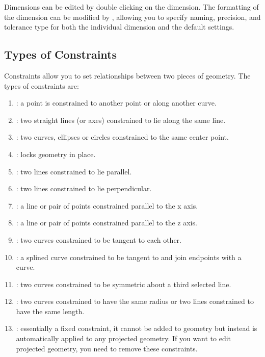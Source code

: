 Dimensions can be edited by double clicking on the dimension. The formatting of the dimension can be modified by , allowing you to specify naming, precision, and tolerance type for both the individual dimension and the default settings.


\subsection{Types of Constraints}

Constraints allow you to set relationships between two pieces of geometry. The types of constraints are:

\begin{enumerate}
\item {}: a point is constrained to another point or along another curve.
\item {}: two straight lines (or axes) constrained to lie along the same line.
\item {}: two curves, ellipses or circles constrained to the same center point.
\item {}: locks geometry in place.
\item {}: two lines constrained to lie parallel.
\item {}: two lines constrained to lie perpendicular.
\item {}: a line or pair of points constrained parallel to the x axis.
\item {}: a line or pair of points constrained parallel to the z axis.
\item {}: two curves constrained to be tangent to each other.
\item {}: a splined curve constrained to be tangent to and join endpoints with a curve.
\item {}: two curves constrained to be symmetric about a third selected line.
\item {}: two curves constrained to have the same radius or two lines constrained to have the same length.
\item {}: essentially a fixed constraint, it cannot be added to geometry but instead is automatically applied to any projected geometry. If you want to edit projected geometry, you need to remove these constraints.
\end{enumerate}


